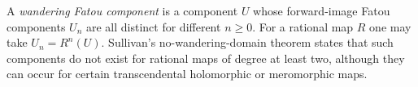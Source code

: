 
A \emph{wandering Fatou component} is a component $U$ whose forward-image Fatou components $U_n$ are all distinct for different $n\ge0$. For a rational map $R$ one may take $U_n=R^n(U)$. Sullivan's no-wandering-domain theorem states that such components do not exist for rational maps of degree at least two, although they can occur for certain transcendental holomorphic or meromorphic maps.
